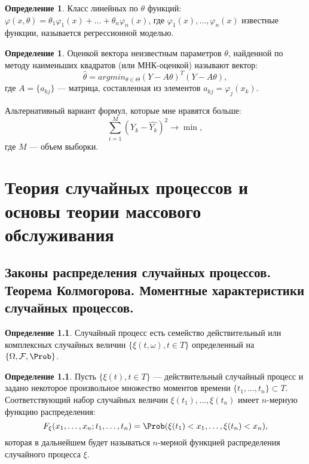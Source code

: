 \documentclass[12pt]{report}
\theoremstyle{definition}
\newtheorem{definition}[theorem]{Определение}
\newcommand{\F}{\mathcal F}
\begin{document}
\begin{definition}
Класс линейных по $\theta$ функций:
$\varphi(x, \theta) = \theta_1 \varphi_1(x) + \dots + \theta_n \varphi_n(x)$,
где $\varphi_1(x), \dots, \varphi_n(x)$ известные функции, называется регрессионной моделью.
\end{definition}

\begin{definition}
Оценкой вектора неизвестным параметров $\theta$, найденной по методу
наименьших квадратов (или МНК-оценкой) называют вектор:
$$
\hat{\theta} = argmin_{\theta \in \Theta} (Y - A \theta)^T (Y - A \theta),
$$ где $A = \{a_{kj}\}$ --- матрица, составленная из элементов
$a_{kj} = \varphi_j(x_k)$.
\end{definition}

Альтернативный вариант формул, которые мне нравятся больше:
$$
\sum\limits_{i = 1}^{M} (Y_k - \hat{Y_k})^2 \rightarrow \min,
$$
где $M$ --- объем выборки.


\chapter{Теория случайных процессов и основы теории массового обслуживания}

\section
{
  Законы распределения случайных процессов. Теорема Колмогорова.
  Моментные характеристики случайных процессов.
}

\begin{definition}
Случайный процесс есть семейство действительный или комплексных
случайных величин $\{\xi(t, \omega), t \in T\}$ определенный на
$\{\Omega, \F, \Prob\}$.
\end{definition}

\begin{definition}
Пусть $\{\xi(t), t \in T\}$ --- действительный случайный процесс и
задано некоторое произвольное множество моментов времени
$\{t_1, \dots, t_n\} \subset T$. Соответствующий набор случайных величин
$\xi(t_1), \dots, \xi(t_n)$ имеет $n$-мерную функцию распределения:
$$
F_\xi(x_1, \dots, x_n; t_1, \dots, t_n) = \Prob(\xi(t_1) < x_1, \dots, \xi(t_n) < x_n),
$$
которая в дальнейшем будет называться $n$-мерной функцией распределения случайного
процесса $\xi$.
\end{definition}
\end{document}
